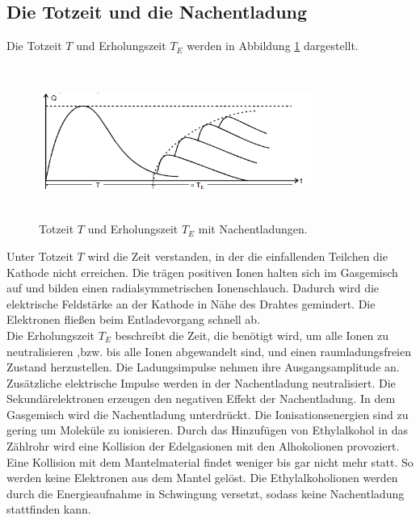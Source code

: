 \subsection{Die Totzeit und die Nachentladung}
Die Totzeit $T$ und Erholungszeit $T_{{E}}$ werden in Abbildung \ref{fig:Zählrohrspannung} dargestellt.
\begin{figure}[H]
\begin{center}
\includegraphics[width = 9cm, height= 5cm]{Zählrohrspannung.png}
\caption{Totzeit $T$ und Erholungszeit $T_{{E}}$ mit Nachentladungen.\protect\cite{AL}}  
\label{fig:Zählrohrspannung}
\end{center}
\end{figure}
\noindent
Unter Totzeit $T$ wird die Zeit verstanden, in der die einfallenden Teilchen die Kathode nicht erreichen.
Die trägen positiven Ionen halten sich im Gasgemisch auf und bilden einen radialsymmetrischen Ionenschlauch.
Dadurch wird die elektrische Feldstärke an der Kathode in Nähe des Drahtes gemindert.
Die Elektronen fließen beim Entladevorgang schnell ab. \\
Die Erholungszeit $T_{{E}}$ beschreibt die Zeit, die benötigt wird, um alle Ionen zu neutralisieren ,bzw. bis alle Ionen abgewandelt sind,
 und einen raumladungsfreien Zustand herzustellen.
Die Ladungsimpulse nehmen ihre Ausgangsamplitude an. \\
Zusätzliche elektrische Impulse werden in der Nachentladung neutralisiert. Die Sekundärelektronen erzeugen den negativen Effekt der Nachentladung.
In dem Gasgemisch wird die Nachentladung unterdrückt.
Die Ionisationsenergien sind zu gering um Moleküle zu ionisieren.
Durch das Hinzufügen von Ethylalkohol in das Zählrohr wird eine Kollision der Edelgasionen mit den
Alhokolionen provoziert.
Eine Kollision mit dem Mantelmaterial findet weniger bis gar nicht mehr statt.
So werden keine Elektronen aus dem Mantel gelöst.
Die Ethylalkoholionen werden durch die Energieaufnahme in Schwingung versetzt, sodass keine Nachentladung stattfinden kann.
